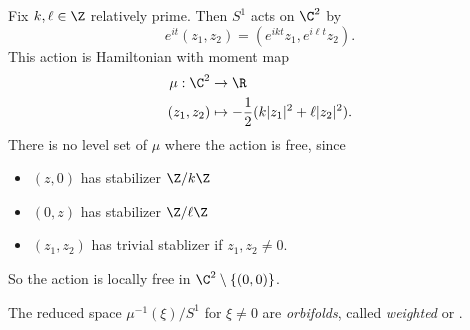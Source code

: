 \documentclass[a4paper]{article}
\begin{document}
\begin{eg}
  Fix $k, \ell \in \Z$ relatively prime. Then $S^1$ acts on $\C^2$ by
  \[
    e^{it} (z_1, z_2) = (e^{ikt} z_1, e^{i\ell t} z_2).
  \]
  This action is Hamiltonian with moment map
  \begin{align*}
    \mu: \C^2 &\to \R\\
    (z_1, z_2) &\mapsto - \frac{1}{2} (k |z_1|^2 + \ell |z_2|^2).
  \end{align*}
  There is no level set of $\mu$ where the action is free, since
  \begin{itemize}
    \item $(z, 0)$ has stabilizer $\Z/k\Z$
    \item $(0, z)$ has stabilizer $\Z/\ell \Z$
    \item $(z_1, z_2)$ has trivial stablizer if $z_1, z_2 \not= 0$.
  \end{itemize}
  So the action is locally free in $\C^2 \setminus \{(0, 0)\}$. 

  The reduced space $\mu^{-1}(\xi)/S^1$ for $\xi \not= 0$ are \emph{orbifolds}, called \emph{weighted} or .
\end{eg}
\end{document}
